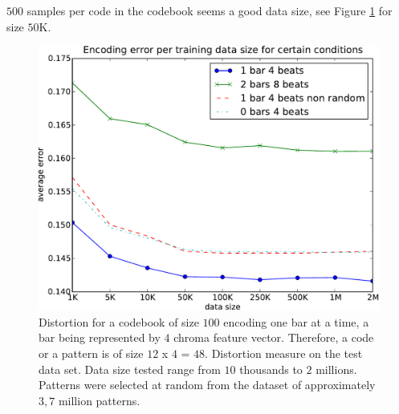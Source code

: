 \documentclass{article}
\begin{document}
$500$ samples per code in the codebook seems a good data size, see
Figure \ref{fig:sizes} for size $50$K.

\begin{figure}[htb]
\begin{center}
\includegraphics[width=.99\columnwidth]{data_sizes}
\end{center}
\caption{{Distortion for a codebook of size $100$ encoding one bar
at a time, a bar being represented by $4$ chroma feature vector.
Therefore, a code or a pattern is of size $12$ x $4$ = $48$.
Distortion measure on the test data set. Data size tested range
from $10$ thousands to $2$ millions. Patterns were selected at
random from the dataset of approximately $3,7$ million patterns.}}
\label{fig:sizes}
\end{figure}
\end{document}
